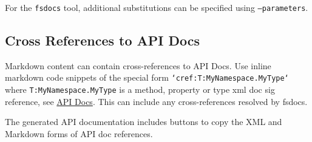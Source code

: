 \documentclass{article}
\begin{document}
For the \texttt{fsdocs} tool, additional substitutions can be specified using \texttt{--parameters}.
\subsection*{Cross References to API Docs}



Markdown content can contain cross-references to API Docs.  Use inline
markdown code snippets of the special form \texttt{`cref:T:MyNamespace.MyType`} where \texttt{T:MyNamespace.MyType}
is a method, property or type xml doc sig reference, see \href{apidocs.html}{API Docs}.
This can include any cross-references resolved by fsdocs.


The generated API documentation includes buttons to copy the XML and Markdown forms of API doc references.
\end{document}
